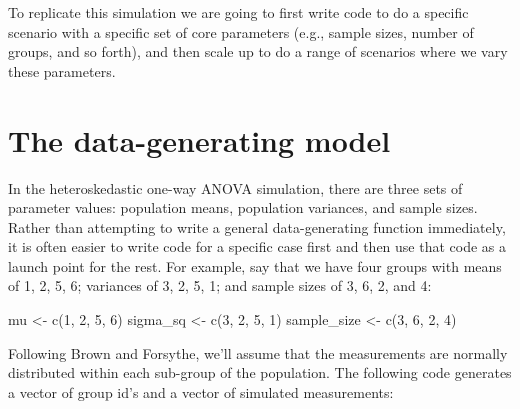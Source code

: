 \documentclass[
]{book}
\newenvironment{Shaded}{\begin{snugshade}}{\end{snugshade}}
\newcommand{\DecValTok}[1]{\textcolor[rgb]{0.00,0.00,0.81}{#1}}
\newcommand{\FunctionTok}[1]{\textcolor[rgb]{0.00,0.00,0.00}{#1}}
\newcommand{\NormalTok}[1]{#1}
\newcommand{\OtherTok}[1]{\textcolor[rgb]{0.56,0.35,0.01}{#1}}
\begin{document}
To replicate this simulation we are going to first write code to do a specific scenario with a specific set of core parameters (e.g., sample sizes, number of groups, and so forth), and then scale up to do a range of scenarios where we vary these parameters.

\hypertarget{the-data-generating-model}{%
\section{The data-generating model}\label{the-data-generating-model}}

In the heteroskedastic one-way ANOVA simulation, there are three sets of parameter values: population means, population variances, and sample sizes.
Rather than attempting to write a general data-generating function immediately, it is often easier to write code for a specific case first and then use that code as a launch point for the rest.
For example, say that we have four groups with means of 1, 2, 5, 6; variances of 3, 2, 5, 1; and sample sizes of 3, 6, 2, and 4:

\begin{Shaded}
\begin{Highlighting}[]
\NormalTok{mu }\OtherTok{\textless{}{-}} \FunctionTok{c}\NormalTok{(}\DecValTok{1}\NormalTok{, }\DecValTok{2}\NormalTok{, }\DecValTok{5}\NormalTok{, }\DecValTok{6}\NormalTok{)}
\NormalTok{sigma\_sq }\OtherTok{\textless{}{-}} \FunctionTok{c}\NormalTok{(}\DecValTok{3}\NormalTok{, }\DecValTok{2}\NormalTok{, }\DecValTok{5}\NormalTok{, }\DecValTok{1}\NormalTok{)}
\NormalTok{sample\_size }\OtherTok{\textless{}{-}} \FunctionTok{c}\NormalTok{(}\DecValTok{3}\NormalTok{, }\DecValTok{6}\NormalTok{, }\DecValTok{2}\NormalTok{, }\DecValTok{4}\NormalTok{)}
\end{Highlighting}
\end{Shaded}

Following Brown and Forsythe, we'll assume that the measurements are normally distributed within each sub-group of the population. The following code generates a vector of group id's and a vector of simulated measurements:
\end{document}
